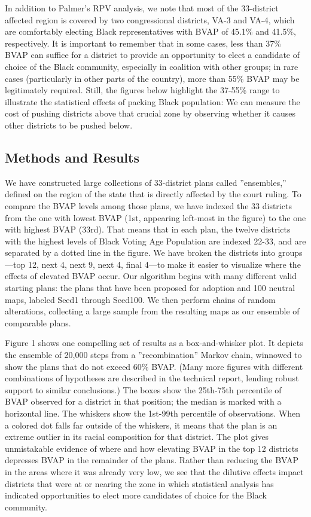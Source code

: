 \documentclass{mgggarticle}
\begin{document}
In addition to Palmer’s RPV analysis, we note that
most of the 33-district affected region is covered by two congressional districts, VA-3 and VA-4,
which are comfortably electing Black representatives with BVAP of 45.1\% and 41.5\%, respectively.
It is important to remember that in some cases, less than 37\% BVAP can suffice for a district to
provide an opportunity to elect a candidate of choice of the Black community, especially in coalition
with other groups; in rare cases (particularly in other parts of the country), more than 55\% BVAP
may be legitimately required. Still, the figures below highlight the 37-55\% range to illustrate the
statistical effects of packing Black population: We can measure the cost of pushing districts above
that crucial zone by observing whether it causes other districts to be pushed below.

\subsection{Methods and Results}

We have constructed large collections of 33-district plans called ”ensembles,” defined on the region
of the state that is directly affected by the court ruling. To compare the BVAP levels among those
plans, we have indexed the 33 districts from the one with lowest BVAP (1st, appearing left-most in
the figure) to the one with highest BVAP (33rd). That means that in each plan, the twelve districts
with the highest levels of Black Voting Age Population are indexed 22-33, and are separated by a
dotted line in the figure. We have broken the districts into groups—top 12, next 4, next 9, next 4,
final 4—to make it easier to visualize where the effects of elevated BVAP occur.
Our algorithm begins with many different valid starting plans: the plans that have been proposed
for adoption and 100 neutral maps, labeled Seed1 through Seed100. We then perform chains
of random alterations, collecting a large sample from the resulting maps as our ensemble of
comparable plans.

Figure 1 shows one compelling set of results as a box-and-whisker plot. It depicts the ensemble
of 20,000 steps from a ”recombination” Markov chain, winnowed to show the plans that do not
exceed 60\% BVAP. (Many more figures with different combinations of hypotheses are described in
the technical report, lending robust support to similar conclusions.) The boxes show the 25th-75th
percentile of BVAP observed for a district in that position; the median is marked with a horizontal
line. The whiskers show the 1st-99th percentile of observations. When a colored dot falls far outside
of the whiskers, it means that the plan is an extreme outlier in its racial composition for that district.
The plot gives unmistakable evidence of where and how elevating BVAP in the top 12 districts
depresses BVAP in the remainder of the plans. Rather than reducing the BVAP in the areas where it
was already very low, we see that the dilutive effects impact districts that were at or nearing the
zone in which statistical analysis has indicated opportunities to elect more candidates of choice for
the Black community.
\end{document}
